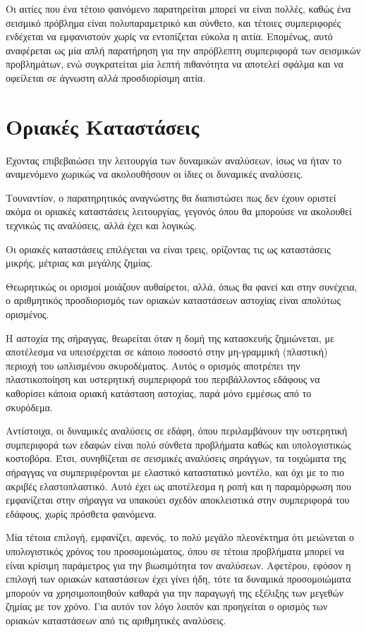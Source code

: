 Οι αιτίες που ένα τέτοιο φαινόμενο παρατηρείται μπορεί να είναι πολλές, καθώς ένα σεισμικό πρόβλημα είναι πολυπαραμετρικό και σύνθετο, και τέτοιες συμπεριφορές ενδέχεται να εμφανιστούν χωρίς να εντοπίζεται εύκολα η αιτία. Επομένως, αυτό αναφέρεται ως μία απλή παρατήρηση για την απρόβλεπτη συμπεριφορά των σεισμικών προβλημάτων, ενώ συγκρατείται μία λεπτή πιθανότητα να αποτελεί σφάλμα και να οφείλεται σε άγνωστη αλλά προσδιορίσιμη αιτία.

\section{Οριακές Καταστάσεις}
Έχοντας επιβεβαιώσει την λειτουργία των δυναμικών αναλύσεων, ίσως να ήταν το αναμενόμενο χωρικώς να ακολουθήσουν οι ίδιες οι δυναμικές αναλύσεις.

Τουναντίον, ο παρατηρητικός αναγνώστης θα διαπιστώσει πως δεν έχουν οριστεί ακόμα οι οριακές καταστάσεις λειτουργίας, γεγονός όπου θα μπορούσε να ακολουθεί τεχνικώς τις αναλύσεις, αλλά έχει και λογικώς.

Οι οριακές καταστάσεις επιλέγεται να είναι τρεις, ορίζοντας τις ως καταστάσεις μικρής, μέτριας και μεγάλης ζημίας.

Θεωρητικώς οι ορισμοί μοιάζουν αυθαίρετοι, αλλά, όπως θα φανεί και στην συνέχεια, ο αριθμητικός προσδιορισμός των οριακών καταστάσεων αστοχίας είναι απολύτως ορισμένος.

Η αστοχία της σήραγγας, θεωρείται όταν η δομή της κατασκευής ζημιώνεται, με αποτέλεσμα να υπεισέρχεται σε κάποιο ποσοστό στην μη-γραμμική (πλαστική) περιοχή του ωπλισμένου σκυροδέματος. Αυτός ο ορισμός αποτρέπει την πλαστικοποίηση και υστερητική συμπεριφορά του περιβάλλοντος εδάφους να καθορίσει κάποια οριακή κατάσταση αστοχίας, παρά μόνο εμμέσως από το σκυρόδεμα.

Αντίστοιχα, οι δυναμικές αναλύσεις σε εδάφη, όπου περιλαμβάνουν την υστερητική συμπεριφορά των εδαφών είναι πολύ σύνθετα προβλήματα καθώς και υπολογιστικώς κοστοβόρα. Έτσι, συνηθίζεται σε σεισμικές αναλύσεις σηράγγων, τα τοιχώματα της σήραγγας να συμπεριφέρονται με ελαστικό καταστατικό μοντέλο, και όχι με το πιο ακριβές ελαστοπλαστικό. Αυτό έχει ως αποτέλεσμα η ροπή και η παραμόρφωση που εμφανίζεται στην σήραγγα να υπακούει σχεδόν αποκλειστικά στην συμπεριφορά του εδάφους, χωρίς πρόσθετα φαινόμενα.

Μία τέτοια επιλογή, εμφανίζει, αφενός, το πολύ μεγάλο πλεονέκτημα ότι μειώνεται ο υπολογιστικός χρόνος του προσομοιώματος, όπου σε τέτοια προβλήματα μπορεί να είναι κρίσιμη παράμετρος για την βιωσιμότητα τον αναλύσεων. Αφετέρου, εφόσον η επιλογή των οριακών καταστάσεων έχει γίνει ήδη, τότε τα δυναμικά προσομοιώματα μπορούν να χρησιμοποιηθούν καθαρά για την παραγωγή της εξέλιξης των μεγεθών ζημίας με τον χρόνο. Για αυτόν τον λόγο λοιπόν και προηγείται ο ορισμός των οριακών καταστάσεων από τις αριθμητικές αναλύσεις.

